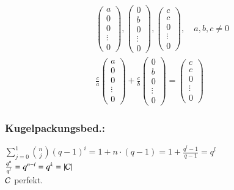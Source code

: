 \begin{align*}
	&\begin{pmatrix}
	a \\ 0 \\ 0 \\ \vdots \\ 0
	\end{pmatrix},
	\begin{pmatrix}
	0 \\ b \\ 0 \\ \vdots \\ 0
	\end{pmatrix},
	\begin{pmatrix}
	c \\ c \\ 0 \\ \vdots \\ 0
	\end{pmatrix}, \quad a,b,c \neq 0
	\\
	&\frac{c}{a}
	\begin{pmatrix}
	a \\ 0 \\ 0 \\ \vdots \\ 0
	\end{pmatrix} +
	\frac{c}{b}
	\begin{pmatrix}
	0 \\ b \\ 0 \\ \vdots \\ 0
	\end{pmatrix} =
	\begin{pmatrix}
	c \\ c \\ 0 \\ \vdots \\ 0
	\end{pmatrix}
\end{align*}
\subsubsection{Kugelpackungsbed.:}
$\sum_{j=0}^1{\binom{n}{j} (q-1)^i}=1 + n \cdot (q-1) = 1 + \frac{q^l-1}{q-1}=q^l$\\
$\frac{q^n}{q^l}=q^{n-l}=q^k = \left| \mathcal{C} \right|$\\
$\mathcal{C}$ perfekt.